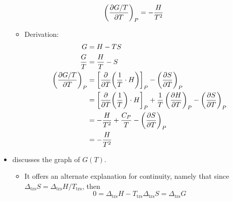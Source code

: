 \documentclass[../notes.tex]{subfiles}
\begin{document}
\begin{itemize}
\begin{equation*}
        \left( \pdv{G/T}{T} \right)_P = -\frac{H}{T^2}
    \end{equation*}
    \begin{itemize}
        \item Derivation:
        \begin{align*}
            G &= H-TS\\
            \frac{G}{T} &= \frac{H}{T}-S\\
            \left( \pdv{G/T}{T} \right)_P &= \left[ \pdv{T}(\frac{1}{T}\cdot H) \right]_P-\left( \pdv{S}{T} \right)_P\\
            &= \left[ \pdv{T}(\frac{1}{T})\cdot H \right]_P+\frac{1}{T}\left( \pdv{H}{T} \right)_P-\left( \pdv{S}{T} \right)_P\\
            &= -\frac{H}{T^2}+\frac{C_P}{T}-\left( \pdv{S}{T} \right)_P\\
            &= -\frac{H}{T^2}
        \end{align*}
    \end{itemize}
    \item \textcite{bib:McQuarrieSimon} discusses the graph of $G(T)$.
    \begin{itemize}
        \item It offers an alternate explanation for continuity, namely that since $\Delta_\text{trs}S=\Delta_\text{trs}H/T_\text{trs}$, then
        \begin{equation*}
            0 = \Delta_\text{trs}H-T_\text{trs}\Delta_\text{trs}S = \Delta_\text{trs}G
        \end{equation*}
    \end{itemize}
\end{itemize}
\end{document}
